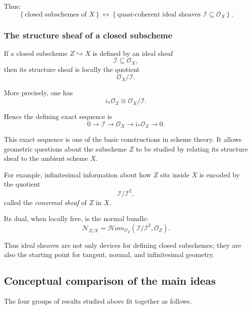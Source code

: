 \documentclass[12pt,a4paper]{article}
\newcommand{\OO}{\mathcal{O}}
\theoremstyle{notespace}
\begin{document}
Thus:
\[
\boxed{
	\left\{
	\text{closed subschemes of }X
	\right\}
	\longleftrightarrow
	\left\{
	\text{quasi-coherent ideal sheaves }
	\mathcal{I}\subseteq\OO_X
	\right\}.
}
\]

\subsubsection{The structure sheaf of a closed subscheme}

If a closed subscheme \(Z\hookrightarrow X\) is defined by an ideal sheaf
\[
\mathcal{I}\subseteq\OO_X,
\]
then its structure sheaf is locally the quotient
\[
\OO_X/\mathcal{I}.
\]

More precisely, one has
\[
i_*\OO_Z\cong \OO_X/\mathcal{I}.
\]

Hence the defining exact sequence is
\[
\boxed{
	0
	\longrightarrow
	\mathcal{I}
	\longrightarrow
	\OO_X
	\longrightarrow
	i_*\OO_Z
	\longrightarrow
	0.
}
\]

This exact sequence is one of the basic constructions in scheme theory. It allows geometric questions about the subscheme \(Z\) to be studied by relating its structure sheaf to the ambient scheme \(X\).

For example, infinitesimal information about how \(Z\) sits inside \(X\) is encoded by the quotient
\[
\mathcal{I}/\mathcal{I}^2,
\]
called the \emph{conormal sheaf} of \(Z\) in \(X\).

Its dual, when locally free, is the normal bundle:
\[
\mathcal{N}_{Z/X}
=
\mathcal{H}om_{\OO_Z}
\left(
\mathcal{I}/\mathcal{I}^2,
\OO_Z
\right).
\]

Thus ideal sheaves are not only devices for defining closed subschemes; they are also the starting point for tangent, normal, and infinitesimal geometry.

\subsection{Conceptual comparison of the main ideas}

The four groups of results studied above fit together as follows.
\end{document}
